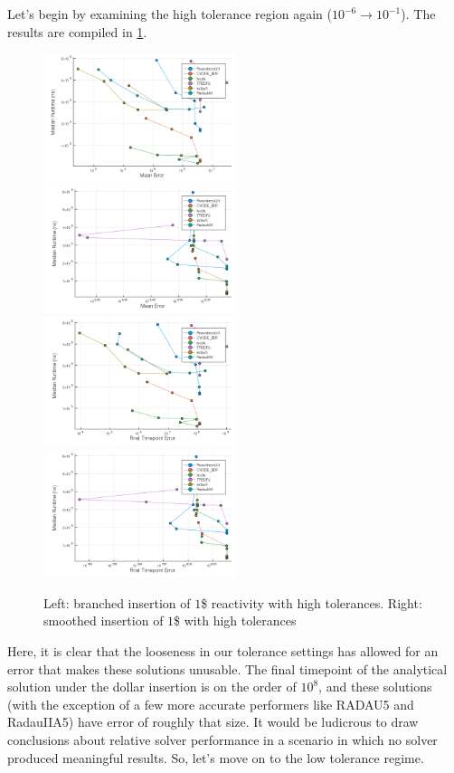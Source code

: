 \documentclass[review,onefignum,onetabnum]{siamart171218}
\begin{document}
Let's begin by examining the high tolerance region again ($10^{-6} \rightarrow 10^{-1}$).
The results are compiled in \cref{fig:high-tol-both-dollar}.
\begin{figure}
  \includegraphics[width=0.5\textwidth]{../plots/work-precision/-high_tolerance_421pcm.png}
  \includegraphics[width=0.5\textwidth]{../plots/work-precision/-high_tolerance_421pcm_tanh.png}
  \includegraphics[width=0.5\textwidth]{../plots/work-precision/final_tp-high_tolerance_421pcm.png}
  \includegraphics[width=0.5\textwidth]{../plots/work-precision/final_tp-high_tolerance_421pcm_tanh.png}
  \caption{Left: branched insertion of $1$\$ reactivity with high tolerances.
  Right: smoothed insertion of $1$\$ with high tolerances}
  \label{fig:high-tol-both-dollar}
\end{figure}
Here, it is clear that the looseness in our tolerance settings has allowed for
an error that makes these solutions unusable. The final timepoint of the analytical
solution under the dollar insertion is on the order of $10^8$, and these solutions
(with the exception of a few more accurate performers like RADAU5 and RadauIIA5)
have error of roughly that size. It would be ludicrous to draw conclusions about
relative solver performance in a scenario in which no solver produced meaningful
results. So, let's move on to the low tolerance regime. \\
\end{document}
